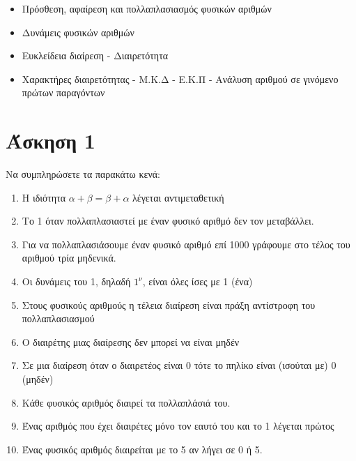 \documentclass[a4paper,10pt]{report}
\begin{document}
\vspace{2em}
\begin{itemize}
\item Πρόσθεση, αφαίρεση και πολλαπλασιασμός φυσικών αριθμών
\item Δυνάμεις φυσικών αριθμών
\item Ευκλείδεια διαίρεση - Διαιρετότητα
\item Χαρακτήρες διαιρετότητας - Μ.Κ.Δ - Ε.Κ.Π - Ανάλυση αριθμού σε γινόμενο πρώτων παραγόντων
\end{itemize}


\section*{Άσκηση 1  \hfill \small{}}
Να συμπληρώσετε τα παρακάτω κενά:
\begin{enumerate}[1)]
 \item Η ιδιότητα $α+β=β+α$ λέγεται \color{bluesite} αντιμεταθετική \color{cblack}
 \item Το 1 όταν \color{bluesite} πολλαπλασιαστεί  \color{cblack} με έναν φυσικό αριθμό δεν τον μεταβάλλει.
 \item Για να πολλαπλασιάσουμε έναν φυσικό αριθμό επί 1000 γράφουμε στο τέλος του αριθμού \color{bluesite} τρία \color{cblack}
       μηδενικά.
 \item Οι δυνάμεις του 1, δηλαδή $1^{ν}$, είναι όλες ίσες με \color{bluesite} 1 (ένα) \color{cblack}
 \item Στους φυσικούς αριθμούς η τέλεια διαίρεση είναι πράξη αντίστροφη του \color{bluesite} πολλαπλασιασμού \color{cblack}
 \item Ο διαιρέτης μιας διαίρεσης δεν μπορεί να είναι \color{bluesite} μηδέν \color{cblack}
 \item Σε μια διαίρεση όταν ο διαιρετέος είναι 0 τότε το πηλίκο είναι (ισούται με) \color{bluesite} 0 (μηδέν) \color{cblack}
 \item Κάθε φυσικός αριθμός \color{bluesite} διαιρεί \color{cblack} τα πολλαπλάσιά του.
 \item Ένας αριθμός που έχει διαιρέτες μόνο τον εαυτό του και το 1 λέγεται \color{bluesite} πρώτος \color{cblack}
 \item Ένας φυσικός αριθμός \color{bluesite} διαιρείται \color{cblack} με το 5 αν λήγει σε 0 ή 5.
\end{enumerate}
\end{document}
